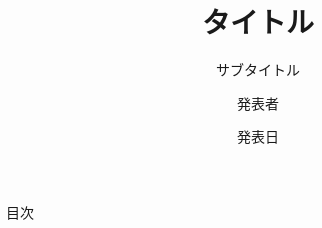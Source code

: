 
  \newcommand{\diag}[1]{\mathrm{diag}(#1)}
  \newcommand{\red}[1]{\textcolor{red}{#1}}
  \makeatletter
  \newcommand{\figcaption}[1]{\def\@captype{figure}\caption{#1}}
  \newcommand{\tblcaption}[1]{\def\@captype{table}\caption{#1}}
  \makeatother

  \usepackage{bm}
  \usepackage{url}

  \title{タイトル}
  \subtitle{サブタイトル}
  \author{発表者}
  \date{発表日}





\begin{frame}
  \titlepage
\end{frame}

\begin{frame}{目次}
  \tableofcontents
\end{frame}



